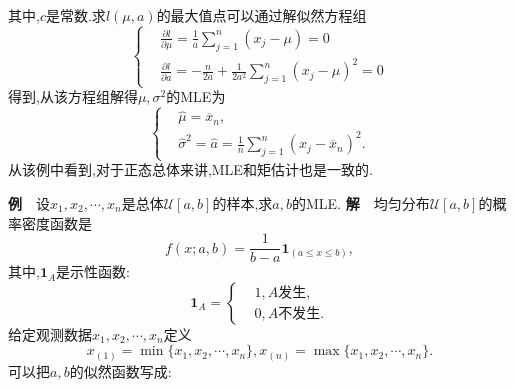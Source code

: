 	\begin{frame}
		其中,$c$是常数.求$l(\mu,a)$的最大值点可以通过解似然方程组
		\begin{equation}  
		\left\{
		\begin{aligned}
		&\frac{\partial l}{\partial \mu} = \frac{1}{a}\sum_{j=1}^n(x_j-\mu) = 0 \\
		&\frac{\partial l}{\partial a} = -\frac{n}{2a}+\frac{1}{2a^2}\sum_{j=1}^n(x_j-\mu)^2 = 0
		\end{aligned}
		\right.
		\end{equation}
		得到,从该方程组解得$\mu,\sigma^2$的MLE为
		\begin{equation}  
		\left\{
		\begin{aligned}
		&\widehat{\mu} = \overline{x}_n, \\
		&\widehat{\sigma}^2 = \widehat{a} = \frac{1}{n}\sum_{j=1}^n(x_j-\overline{x}_n)^2.
		\end{aligned}
		\right.
		\end{equation}
		从该例中看到,对于正态总体来讲,MLE和矩估计也是一致的.
	\end{frame}

	\begin{frame}
		\textbf{例}$\quad$设$x_1,x_2,\cdots,x_n$是总体$\mathcal{U}[a,b]$的样本,求$a,b$的MLE.
		\textbf{解}$\quad$均匀分布$\mathcal{U}[a,b]$的概率密度函数是
		\begin{equation}
			f(x;a,b) = \frac{1}{b-a}\bm{1}_{(a\leqslant x\leqslant b)},
		\end{equation}
		其中,$\bm{1}_{A}$是示性函数:
		\begin{equation}  
		\bm{1}_{A} = \left\{
		\begin{aligned}
		&1,A\text{发生}, \\
		&0,A\text{不发生}.
		\end{aligned}
		\right.
		\end{equation}
		给定观测数据$x_1,x_2,\cdots,x_n$定义
		\begin{equation}
			x_{(1)} = \min\{x_1,x_2,\cdots,x_n\},x_{(n)} = \max\{x_1,x_2,\cdots,x_n\}.
		\end{equation}
		可以把$a,b$的似然函数写成:
	\end{frame}

